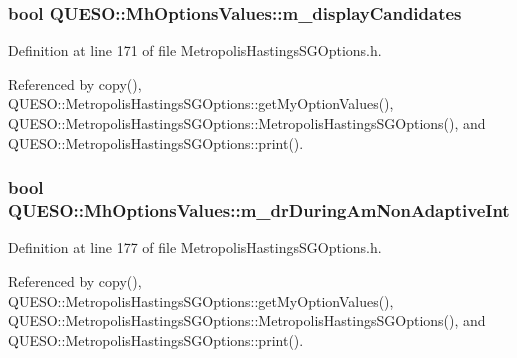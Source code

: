 \hypertarget{class_q_u_e_s_o_1_1_mh_options_values_a1df386cecfd87745e4d8adfb472d3443}{
\subsubsection[{m\-\_\-display\-Candidates}]{\setlength{\rightskip}{0pt plus 5cm}bool Q\-U\-E\-S\-O\-::\-Mh\-Options\-Values\-::m\-\_\-display\-Candidates}}\label{class_q_u_e_s_o_1_1_mh_options_values_a1df386cecfd87745e4d8adfb472d3443}


Definition at line 171 of file Metropolis\-Hastings\-S\-G\-Options.\-h.



Referenced by copy(), Q\-U\-E\-S\-O\-::\-Metropolis\-Hastings\-S\-G\-Options\-::get\-My\-Option\-Values(), Q\-U\-E\-S\-O\-::\-Metropolis\-Hastings\-S\-G\-Options\-::\-Metropolis\-Hastings\-S\-G\-Options(), and Q\-U\-E\-S\-O\-::\-Metropolis\-Hastings\-S\-G\-Options\-::print().

\hypertarget{class_q_u_e_s_o_1_1_mh_options_values_ab546a17967c0690d0c01730f63ccb70b}{
\subsubsection[{m\-\_\-dr\-During\-Am\-Non\-Adaptive\-Int}]{\setlength{\rightskip}{0pt plus 5cm}bool Q\-U\-E\-S\-O\-::\-Mh\-Options\-Values\-::m\-\_\-dr\-During\-Am\-Non\-Adaptive\-Int}}\label{class_q_u_e_s_o_1_1_mh_options_values_ab546a17967c0690d0c01730f63ccb70b}


Definition at line 177 of file Metropolis\-Hastings\-S\-G\-Options.\-h.



Referenced by copy(), Q\-U\-E\-S\-O\-::\-Metropolis\-Hastings\-S\-G\-Options\-::get\-My\-Option\-Values(), Q\-U\-E\-S\-O\-::\-Metropolis\-Hastings\-S\-G\-Options\-::\-Metropolis\-Hastings\-S\-G\-Options(), and Q\-U\-E\-S\-O\-::\-Metropolis\-Hastings\-S\-G\-Options\-::print().

